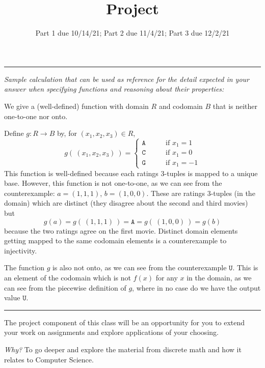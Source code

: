 \documentclass[12pt, oneside]{article}
\newcommand{\A}[0]{\texttt{A}}
\newcommand{\C}[0]{\texttt{C}}
\newcommand{\G}[0]{\texttt{G}}
\newcommand{\U}[0]{\texttt{U}}
\begin{document}
\begin{enumerate}
    \rule{0.5\textwidth}{.4pt}

    {\it Sample calculation that can be used as reference for the detail expected 
    in your answer when specifying functions and reasoning about their properties:} 
    
    We give a (well-defined) function with domain $R$ and codomain $B$ that is neither one-to-one nor onto.

    Define $g: R \to B$ by, for $(x_1, x_2,x_3) \in R$,
    \[
        g(~(x_1, x_2, x_3)~) = \begin{cases} 
            \A \qquad &\text{if $x_1 = 1$} \\
            \C \qquad &\text{if $x_1 = 0$} \\
            \G \qquad &\text{if $x_1 = -1$}
        \end{cases}
    \]
    This function is well-defined because each ratings $3$-tuples is mapped to a unique base.
    However, this function is not one-to-one, as we can see from the counterexample: 
    $a = (1,1,1)$, $b = (1, 0,0)$. These are ratings $3$-tuples (in the domain) which are 
    distinct (they disagree about the second and third movies) but
    \[
        g(a) = g(~(1,1,1)~) = \A = g(~(1,0,0)~) = g(b)
    \]
    because the two ratings agree on the first movie. Distinct domain 
    elements getting mapped to the same codomain elements is a counterexample to injectivity.

    The function $g$ is also not onto, as we can see from the counterexample $\U$. This is an 
    element of the codomain which is not $f(x)$ for any $x$ in the domain, as we can see 
    from the piecewise definition of $g$, where in no case do we have the output value $\U$.
    \rule{0.5\textwidth}{.4pt}


\end{enumerate}


    
\newpage

\title{Project}
\date{Part 1 due 10/14/21; Part 2 due 11/4/21; Part 3 due 12/2/21}


\maketitle
\thispagestyle{fancy}
The project component of this class will be an opportunity for you to extend your 
work on assignments and explore applications of your choosing. 

{\it Why?}
To go deeper and explore the material from discrete math and how it relates to Computer Science.
\end{document}
